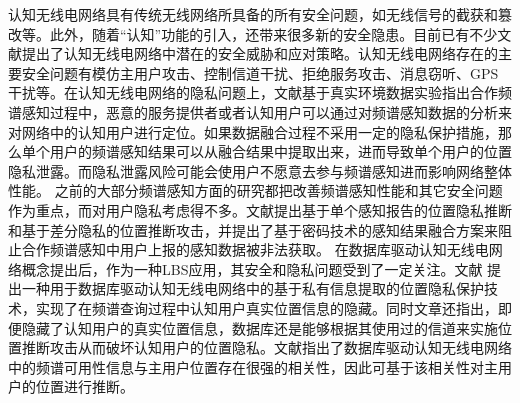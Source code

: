 认知无线电网络具有传统无线网络所具备的所有安全问题，如无线信号的截获和篡改等。此外，随着“认知”功能的引入，还带来很多新的安全隐患。目前已有不少文献提出了认知无线电网络中潜在的安全威胁和应对策略。认知无线电网络存在的主要安全问题有模仿主用户攻击\cite{chen2008defense}、控制信道干扰\cite{bian2006mac}、拒绝服务攻击、消息窃听、GPS干扰等。在认知无线电网络的隐私问题上，文献\cite{li2012location}基于真实环境数据实验指出合作频谱感知过程中，恶意的服务提供者或者认知用户可以通过对频谱感知数据的分析来对网络中的认知用户进行定位。如果数据融合过程不采用一定的隐私保护措施，那么单个用户的频谱感知结果可以从融合结果中提取出来，进而导致单个用户的位置隐私泄露。而隐私泄露风险可能会使用户不愿意去参与频谱感知进而影响网络整体性能。
之前的大部分频谱感知方面的研究都把改善频谱感知性能\cite{chen2008robust,quan2009optimal}和其它安全问题\cite{he2013byzantine,li2011believe}作为重点，而对用户隐私考虑得不多。文献\cite{li2012location}提出基于单个感知报告的位置隐私推断和基于差分隐私的位置推断攻击，并提出了基于密码技术的感知结果融合方案来阻止合作频谱感知中用户上报的感知数据被非法获取。
在数据库驱动认知无线电网络概念提出后，作为一种LBS应用，其安全和隐私问题受到了一定关注。文献
\cite{gao2013location}提出一种用于数据库驱动认知无线电网络中的基于私有信息提取的位置隐私保护技术，实现了在频谱查询过程中认知用户真实位置信息的隐藏。同时文章还指出，即便隐藏了认知用户的真实位置信息，数据库还是能够根据其使用过的信道来实施位置推断攻击从而破坏认知用户的位置隐私。文献\cite{bahrak2014protecting}指出了数据库驱动认知无线电网络中的频谱可用性信息与主用户位置存在很强的相关性，因此可基于该相关性对主用户的位置进行推断。


